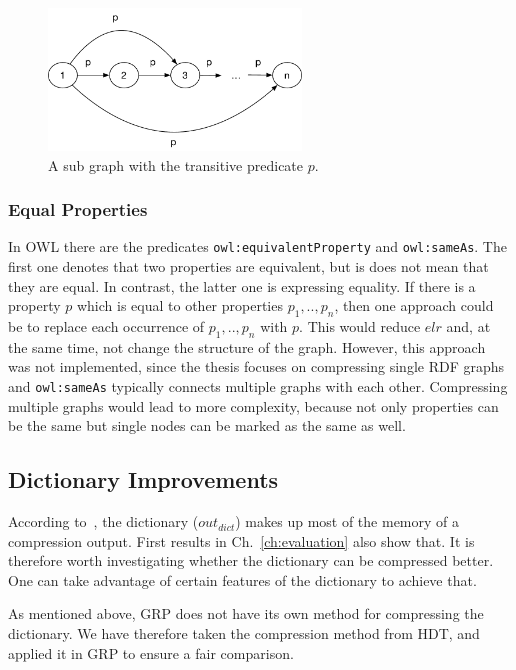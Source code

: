 \begin{figure}[h]
	\centering
	\includegraphics[width=0.6\textwidth]{figures/approach/transitiveMat}
	\caption{A sub graph with the transitive predicate $p$.}
	\label{fig:transitiveMat}
\end{figure}


\subsubsection{Equal Properties}

In OWL there are the predicates {\tt owl:equivalentProperty} and {\tt owl:sameAs}. The first one denotes that two properties are equivalent, but is does not mean that they are equal. In contrast, the latter one is expressing equality. If there is a property $p$ which is equal to other properties $p_1,..,p_n$, then one approach could be to replace each occurrence of $p_1,..,p_n$ with $p$. This would reduce $elr$ and, at the same time, not change the structure of the graph. However, this approach was not implemented, since the thesis focuses on compressing single RDF graphs and {\tt owl:sameAs} typically connects multiple graphs with each other. Compressing multiple graphs would lead to more complexity, because not only properties can be the same but single nodes can be marked as the same as well.




\subsection{Dictionary Improvements}\label{sec:approachDictImprovements}


According to~\cite{hdt}, the dictionary ($out_{dict}$) makes up most of the memory of a compression output. First results in Ch.~\ref{ch:evaluation} also show that. It is therefore worth investigating whether the dictionary can be compressed better. One can take advantage of certain features of the dictionary to achieve that.

As mentioned above, GRP does not have its own method for compressing the dictionary. We have therefore taken the compression method from HDT, and applied it in GRP to ensure a fair comparison.

